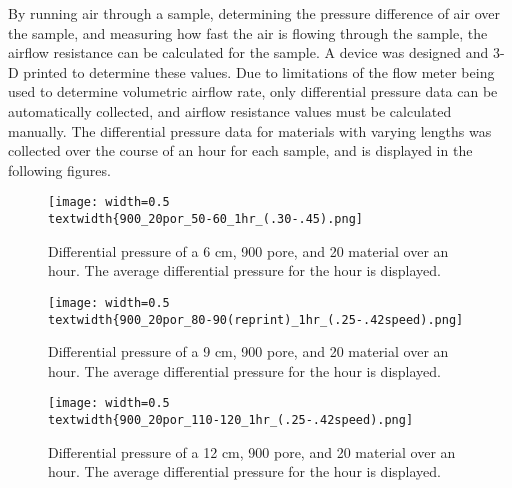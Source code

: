 	By running air through a sample, determining the pressure difference of air over the 
sample, and measuring how fast the air is flowing through the sample, the airflow resistance 
can be calculated for the sample. A device was designed and 3-D printed to determine these 
values. Due to limitations of the flow meter being used to determine volumetric airflow rate, 
only differential pressure data can be automatically collected, and airflow resistance values 
must be calculated manually. The differential pressure data for materials with varying 
lengths was collected over the course of an hour for each sample, and is displayed in the 
following figures.
\begin{figure}[h!]
  \begin{center}
    \texttt{[image: width=0.5\\textwidth\{900\_20por\_50-60\_1hr\_(.30-.45).png]}
  \end{center}
  \caption{Differential pressure of a 6 cm, 900 pore, and 20%
material over an hour. The average differential pressure for the hour is displayed.}
  \label{fig:6cm_dp_graph}
\end{figure}

\begin{figure}[h!]
  \begin{center}
    \texttt{[image: width=0.5\\textwidth\{900\_20por\_80-90(reprint)\_1hr\_(.25-.42speed).png]}
  \end{center}
  \caption{Differential pressure of a 9 cm, 900 pore, and 20%
material over an hour. The average differential pressure for the hour is displayed.}
  \label{fig:9cm_dp_graph}
\end{figure}

\begin{figure}[h!]
  \begin{center}
    \texttt{[image: width=0.5\\textwidth\{900\_20por\_110-120\_1hr\_(.25-.42speed).png]}
  \end{center}
  \caption{Differential pressure of a 12 cm, 900 pore, and 20%
material over an hour. The average differential pressure for the hour is displayed.}
  \label{fig:12cm_dp_graph}
\end{figure}
 
